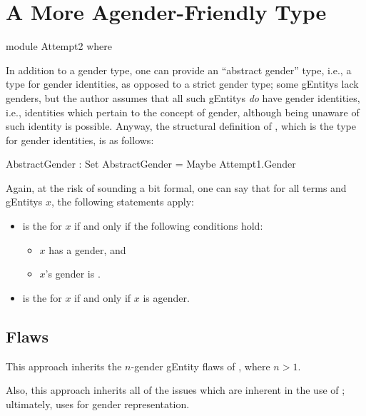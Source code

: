 \documentclass{article}
\begin{document}
\section{A More Agender-Friendly Type}

\begin{code}
module Attempt2 where
\end{code}

In addition to a gender type, one can provide an ``abstract gender'' type, i.e., a type for gender identities, as opposed to a strict gender type; some \glspl{gEntity} lack genders, but the author assumes that all such \glspl{gEntity} \emph{do} have gender identities, i.e., identities which pertain to the concept of gender, although being unaware of such identity is possible.  Anyway, the structural definition of , which is the type for gender identities, is as follows:

\begin{code}
  AbstractGender : Set
  AbstractGender = Maybe Attempt1.Gender
\end{code}

Again, at the risk of sounding a bit formal, one can say that for all  terms  and \glspl{gEntity} \(x\), the following statements apply:

\begin{itemize}
  \item {}  is the  for \(x\) if and only if the following conditions hold:
  \begin{itemize}
    \item \(x\) has a gender, and
    \item \(x\)'s gender is .
  \end{itemize}
  \item {} is the  for \(x\) if and only if \(x\) is agender.
\end{itemize}

\subsection{Flaws}\label{sec:gender2flaws}
This approach inherits the \(n\)-gender \gls{gEntity} flaws of , where \(n > 1\).

Also, this approach inherits all of the issues which are inherent in the use of ; ultimately,  uses  for gender representation.
\end{document}
